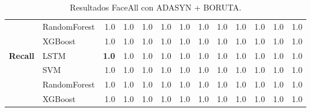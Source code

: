 \begin{table}[h]
\begin{adjustbox}{max width=11cm}
\begin{tabular}{|c|l|r|r|r|r|r|r|r|r|r|r|r|}
			& RandomForest &  1.0 &  1.0 &  1.0 &  1.0 &  1.0 &  1.0 &  1.0 &  1.0 &  1.0 &  1.0 &  1.0 \\
			& XGBoost &  1.0 &  1.0 &  1.0 &  1.0 &  1.0 &  1.0 &  1.0 &  1.0 &  1.0 &  1.0 &  1.0 \\
			\hline
			\textbf{Recall} & LSTM &  \textbf{1.0} &  1.0 &  1.0 &  1.0 &  1.0 &  1.0 &  1.0 &  1.0 &  1.0 &  1.0 &  1.0 \\
			& SVM &  1.0 &  1.0 &  1.0 &  1.0 &  1.0 &  1.0 &  1.0 &  1.0 &  1.0 &  1.0 &  1.0 \\
			& RandomForest &  1.0 &  1.0 &  1.0 &  1.0 &  1.0 &  1.0 &  1.0 &  1.0 &  1.0 &  1.0 &  1.0 \\
			& XGBoost &  1.0 &  1.0 &  1.0 &  1.0 &  1.0 &  1.0 &  1.0 &  1.0 &  1.0 &  1.0 &  1.0 \\
			\hline
			
\end{tabular}
\end{adjustbox}	
\caption{Resultados FaceAll con ADASYN + BORUTA.}
\label{tab:faceAllADASYNBORUTA}
\end{table}

